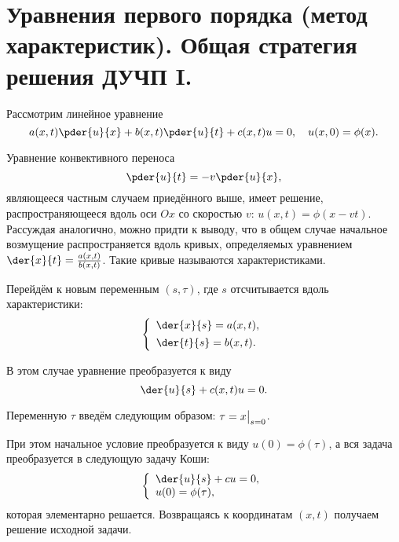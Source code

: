 \chapter{Уравнения первого порядка (метод характеристик). Общая стратегия
решения ДУЧП I.}

Рассмотрим линейное уравнение
\[
    a(x, t)\pder{u}{x} + b(x, t)\pder{u}{t} + c(x, t)u = 0, \quad
    u(x, 0) = \phi(x).
\]

Уравнение конвективного переноса
\[
    \pder{u}{t} = -v\pder{u}{x},
\]
являющееся частным случаем приедённого выше, имеет решение, распространяющееся
вдоль оси \( Ox \) со скоростью \( v \): \( u(x,t) = \phi(x-vt) \). Рассуждая
аналогично, можно придти к выводу, что в общем случае начальное возмущение
распространяется вдоль кривых, определяемых уравнением
\( \der{x}{t} = \frac{a(x,t)}{b(x,t)} \). Такие кривые называются
характеристиками. 

Перейдём к новым переменным \( (s, \tau) \), где \( s \) отсчитывается вдоль
характеристики:
\[
    \left\{ \begin{array}{l}
        \ds \der{x}{s} = a(x, t), \\[.4em]
        \ds \der{t}{s} = b(x, t).
    \end{array} \right.
\]

В этом случае уравнение преобразуется к виду
\[
    \der{u}{s} + c(x, t)u = 0.
\]

Переменную \( \tau \) введём следующим образом: \( \displaystyle \tau = x\bigr|_{s=0} \).

При этом начальное условие преобразуется к виду \( u(0) = \phi(\tau) \), а вся
задача преобразуется в следующую задачу Коши:
\[
    \left\{ \begin{array}{l}
        \ds \der{u}{s} + cu = 0, \\
        u(0) = \phi(\tau),
    \end{array} \right.
\]
которая элементарно решается. Возвращаясь к координатам \( (x, t) \) получаем
решение исходной задачи.
\newpage
